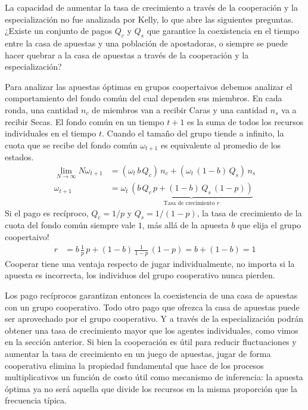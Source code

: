 \documentclass[a4paper,10pt]{book}
\theoremstyle{definition}1
\begin{document}

La capacidad de aumentar la tasa de crecimiento a través de la cooperación y la especialización no fue analizada por Kelly, lo que abre las siguientes preguntas.
%
¿Existe un conjunto de pagos $Q_c$ y $Q_s$ que garantice la coexistencia en el tiempo entre la casa de apuestas y una población de apostadoras, o siempre se puede hacer quebrar a la casa de apuestas a través de la cooperación y la especialización?


Para analizar las apuestas óptimas en grupos coopertaivos debemos analizar el comportamiento del fondo común del cual dependen sus miembros.
%
En cada ronda, una cantidad $n_c$ de miembros van a recibir Caras y una cantidad $n_s$ va a recibir Secas.
%
El fondo común en un tiempo $t+1$ es la suma de todos los recursos individuales en el tiempo $t$.
%
Cuando el tamaño del grupo tiende a infinito, la cuota que se recibe del fondo común $\omega_{t+1}$ es equivalente al promedio de los estados.
%
\begin{equation}
\begin{split}
\lim_{N \rightarrow \infty} N \omega_{t+1} &= (\omega_t \, b \, Q_c ) \, n_c + (\omega_t \, (1-b) \, Q_s ) \, n_s \\
 \omega_{t+1} &=  \omega_t \, \underbrace{\left(  b \, Q_c \, p +  (1-b) \, Q_s \, (1-p) \right)}_{\text{Tasa de crecimiento } r} 
\end{split}
\end{equation}
%
Si el pago es recíproco, $Q_c = 1/p$ y $Q_s = 1/(1-p)$, la tasa de crecimiento de la cuota del fondo común siempre vale $1$, más allá de la apuesta $b$ que elija el grupo coopertaivo!
\begin{equation}
\begin{split}
r &=  b \, \frac{1}{p} \, p +  (1-b) \, \frac{1}{1-p} \, (1-p) = b + (1 - b) = 1
\end{split}
\end{equation}
%
Cooperar tiene una ventaja respecto de jugar individualmente, no importa si la apuesta es incorrecta, los individuos del grupo cooperativo nunca pierden.


Los pago recíprocos garantizan entonces la coexistencia de una casa de apuestas con un grupo cooperativo.
%
Todo otro pago que ofrezca la casa de apuestas puede ser aprovechado por el grupo cooperativo.
%
Y a través de la especialización podrán obtener una tasa de crecimiento mayor que los agentes individuales, como vimos en la sección anterior.
%
Si bien la cooperación es útil para reducir fluctuaciones y aumentar la tasa de crecimiento en un juego de apuestas, jugar de forma cooperativa elimina la propiedad fundamental que hace de los procesos multiplicativos un función de costo útil como mecanismo de inferencia: la apuesta óptima ya no será aquella que divide los recursos en la misma proporción que la frecuencia típica.
\end{document}
